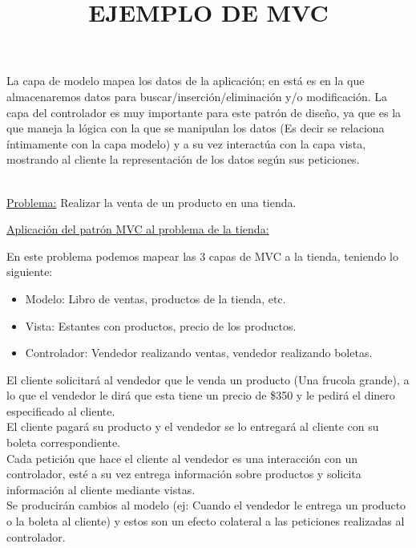 \documentclass[a4paper,11pt]{report}
\begin{document}
 \newpage
La capa de modelo mapea los datos de la aplicación; en está es en la que almacenaremos datos para buscar/inserción/eliminación y/o modificación.
La capa del controlador es muy importante para este patrón de diseño, ya que es la
que maneja la lógica con la que se manipulan los datos (Es decir se relaciona íntimamente con
la capa modelo) y a su vez interactúa con la capa vista, mostrando al cliente la representación de los datos según sus peticiones.\\

\title {\textbf{ EJEMPLO DE MVC}}\\

\underline{Problema:} Realizar la venta de un producto en una tienda.

\underline{Aplicación del patrón MVC al problema de la tienda:}

En este problema podemos mapear las 3 capas de MVC a la tienda, teniendo lo siguiente:

\begin{itemize}
    \item{Modelo:} Libro de ventas, productos de la tienda, etc. 
    \item{Vista:} Estantes con productos, precio de los productos.
    \item{Controlador:} Vendedor realizando ventas, vendedor realizando boletas.
\end{itemize}

El cliente solicitará al vendedor que le venda un producto (Una frucola grande),
a lo que el vendedor le dirá que esta tiene un precio de \$350 y le pedirá el dinero especificado al cliente.\\
El cliente pagará su producto y el vendedor se lo entregará al cliente con su boleta correspondiente.\\
Cada petición que hace el cliente al vendedor es una interacción con
un controlador, esté a su vez entrega información sobre productos y solicita información al cliente mediante vistas.\\
Se producirán cambios al modelo (ej: Cuando el vendedor le entrega
un producto o la boleta al cliente) y estos son un efecto colateral a las peticiones realizadas al controlador.
\end{document}
